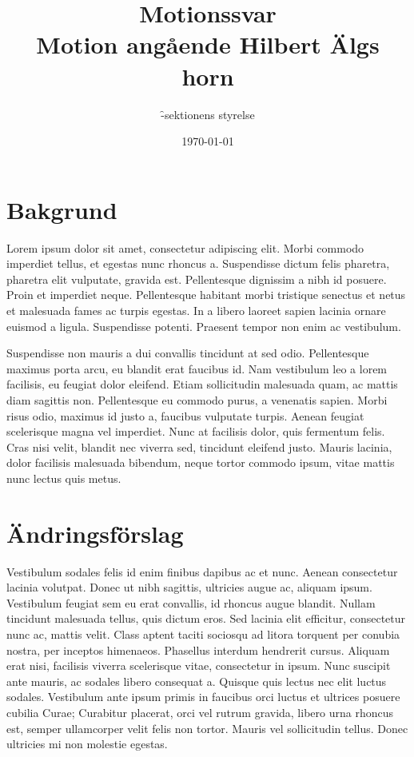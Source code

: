\documentclass[proposition]{fclass}
\date{\today}
\author{\f -sektionens styrelse} %
\title{Motionssvar \\
	\normalsize{Motion angående Hilbert Älgs horn}} %
\begin{document}

\section*{Bakgrund} 

Lorem ipsum dolor sit amet, consectetur adipiscing elit. Morbi commodo imperdiet tellus, et egestas nunc rhoncus a. Suspendisse dictum felis pharetra, pharetra elit vulputate, gravida est. Pellentesque dignissim a nibh id posuere. Proin et imperdiet neque. Pellentesque habitant morbi tristique senectus et netus et malesuada fames ac turpis egestas. In a libero laoreet sapien lacinia ornare euismod a ligula. Suspendisse potenti. Praesent tempor non enim ac vestibulum.

Suspendisse non mauris a dui convallis tincidunt at sed odio. Pellentesque maximus porta arcu, eu blandit erat faucibus id. Nam vestibulum leo a lorem facilisis, eu feugiat dolor eleifend. Etiam sollicitudin malesuada quam, ac mattis diam sagittis non. Pellentesque eu commodo purus, a venenatis sapien. Morbi risus odio, maximus id justo a, faucibus vulputate turpis. Aenean feugiat scelerisque magna vel imperdiet. Nunc at facilisis dolor, quis fermentum felis. Cras nisi velit, blandit nec viverra sed, tincidunt eleifend justo. Mauris lacinia, dolor facilisis malesuada bibendum, neque tortor commodo ipsum, vitae mattis nunc lectus quis metus.

\section*{Ändringsförslag}

Vestibulum sodales felis id enim finibus dapibus ac et nunc. Aenean consectetur lacinia volutpat. Donec ut nibh sagittis, ultricies augue ac, aliquam ipsum. Vestibulum feugiat sem eu erat convallis, id rhoncus augue blandit. Nullam tincidunt malesuada tellus, quis dictum eros. Sed lacinia elit efficitur, consectetur nunc ac, mattis velit. Class aptent taciti sociosqu ad litora torquent per conubia nostra, per inceptos himenaeos. Phasellus interdum hendrerit cursus. Aliquam erat nisi, facilisis viverra scelerisque vitae, consectetur in ipsum. Nunc suscipit ante mauris, ac sodales libero consequat a. Quisque quis lectus nec elit luctus sodales. Vestibulum ante ipsum primis in faucibus orci luctus et ultrices posuere cubilia Curae; Curabitur placerat, orci vel rutrum gravida, libero urna rhoncus est, semper ullamcorper velit felis non tortor. Mauris vel sollicitudin tellus. Donec ultricies mi non molestie egestas.
\end{document}
